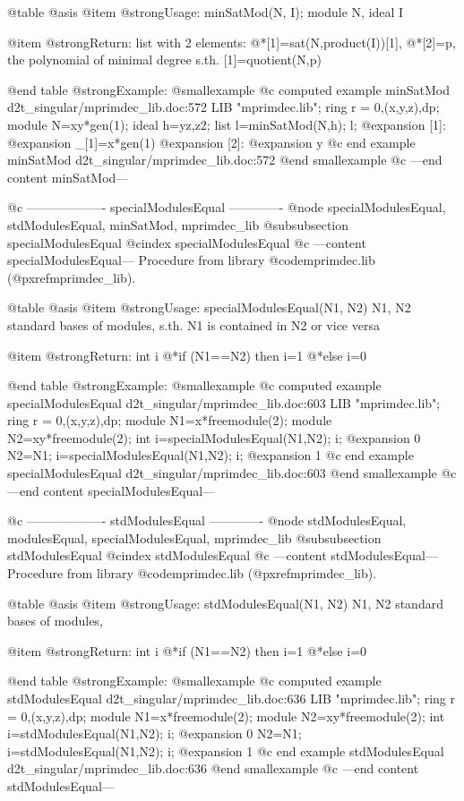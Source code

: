 @table @asis
@item @strong{Usage:}
minSatMod(N, I); module N, ideal I

@item @strong{Return:}
list with 2 elements:
@*[1]=sat(N,product(I))[1],
@*[2]=p, the polynomial of minimal degree s.th. [1]=quotient(N,p)

@end table
@strong{Example:}
@smallexample
@c computed example minSatMod d2t_singular/mprimdec_lib.doc:572 
LIB "mprimdec.lib";
ring  r = 0,(x,y,z),dp;
module N=xy*gen(1);
ideal h=yz,z2;
list l=minSatMod(N,h);
l;
@expansion{} [1]:
@expansion{}    _[1]=x*gen(1)
@expansion{} [2]:
@expansion{}    y
@c end example minSatMod d2t_singular/mprimdec_lib.doc:572
@end smallexample
@c ---end content minSatMod---

@c ------------------- specialModulesEqual -------------
@node specialModulesEqual, stdModulesEqual, minSatMod, mprimdec_lib
@subsubsection specialModulesEqual
@cindex specialModulesEqual
@c ---content specialModulesEqual---
Procedure from library @code{mprimdec.lib} (@pxref{mprimdec_lib}).

@table @asis
@item @strong{Usage:}
specialModulesEqual(N1, N2) N1, N2 standard bases of modules,
s.th. N1 is contained in N2 or vice versa

@item @strong{Return:}
int i
@*if (N1==N2) then i=1
@*else i=0

@end table
@strong{Example:}
@smallexample
@c computed example specialModulesEqual d2t_singular/mprimdec_lib.doc:603 
LIB "mprimdec.lib";
ring  r = 0,(x,y,z),dp;
module N1=x*freemodule(2);
module N2=xy*freemodule(2);
int i=specialModulesEqual(N1,N2);
i;
@expansion{} 0
N2=N1;
i=specialModulesEqual(N1,N2);
i;
@expansion{} 1
@c end example specialModulesEqual d2t_singular/mprimdec_lib.doc:603
@end smallexample
@c ---end content specialModulesEqual---

@c ------------------- stdModulesEqual -------------
@node stdModulesEqual, modulesEqual, specialModulesEqual, mprimdec_lib
@subsubsection stdModulesEqual
@cindex stdModulesEqual
@c ---content stdModulesEqual---
Procedure from library @code{mprimdec.lib} (@pxref{mprimdec_lib}).

@table @asis
@item @strong{Usage:}
stdModulesEqual(N1, N2) N1, N2 standard bases of modules,

@item @strong{Return:}
int i
@*if (N1==N2) then i=1
@*else i=0

@end table
@strong{Example:}
@smallexample
@c computed example stdModulesEqual d2t_singular/mprimdec_lib.doc:636 
LIB "mprimdec.lib";
ring  r = 0,(x,y,z),dp;
module N1=x*freemodule(2);
module N2=xy*freemodule(2);
int i=stdModulesEqual(N1,N2);
i;
@expansion{} 0
N2=N1;
i=stdModulesEqual(N1,N2);
i;
@expansion{} 1
@c end example stdModulesEqual d2t_singular/mprimdec_lib.doc:636
@end smallexample
@c ---end content stdModulesEqual---

